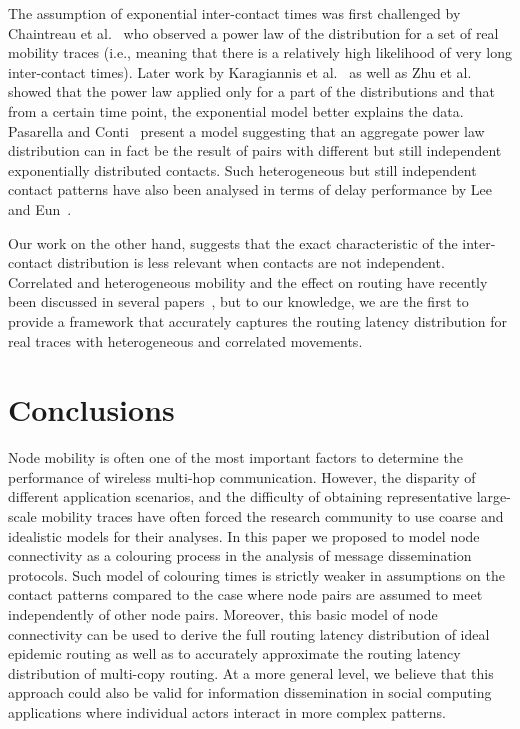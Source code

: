 \documentclass{article}
\begin{document}
The assumption of exponential inter-contact times was first challenged by
Chaintreau et al.~\cite{chaintreau07} who observed a power law of the
distribution for a set of real mobility traces (i.e., meaning that
there is a relatively high likelihood of very long inter-contact
times). Later work by Karagiannis et al.~\cite{karagiannis10} as well
as Zhu et al.~\cite{zhu10} showed that the power law applied only for
a part of the distributions and that from a certain time point, the
exponential model better explains the data. Pasarella and
Conti~\cite{passarella11} present a model suggesting that an aggregate
power law distribution can in fact be the result of pairs with
different but still independent exponentially distributed
contacts. Such heterogeneous but still independent contact patterns
have also been analysed in terms of delay performance by Lee and
Eun~\cite{lee10}.

Our work on the other hand, suggests that the exact characteristic of
the inter-contact distribution is less relevant when contacts are not
independent. Correlated and heterogeneous mobility and the effect on
routing have recently been discussed in several
papers~\cite{cai08,bulut10,ciullo11,hossmann11}, but to our knowledge,
we are the first to provide a framework that accurately captures the
routing latency distribution for real traces with heterogeneous and
correlated movements.
\section{Conclusions}
\label{sec:conclusions}

Node mobility is often one of the most important factors to determine
the performance of wireless multi-hop communication. However, the
disparity of different application scenarios, and the difficulty of
obtaining representative large-scale mobility traces have often forced
the research community to use coarse and idealistic models for their
analyses. In this paper we proposed to model node connectivity as a
colouring process in the analysis of message dissemination
protocols. Such model of colouring times is strictly weaker in
assumptions on the contact patterns compared to the case where node
pairs are assumed to meet independently of other node pairs. Moreover,
this basic model of node connectivity can be used to derive the full
routing latency distribution of ideal epidemic routing as well as to
accurately approximate the routing latency distribution of multi-copy
routing. At a more general level, we believe that this approach could
also be valid for information dissemination in social computing
applications where individual actors interact in more complex
patterns.
\end{document}
